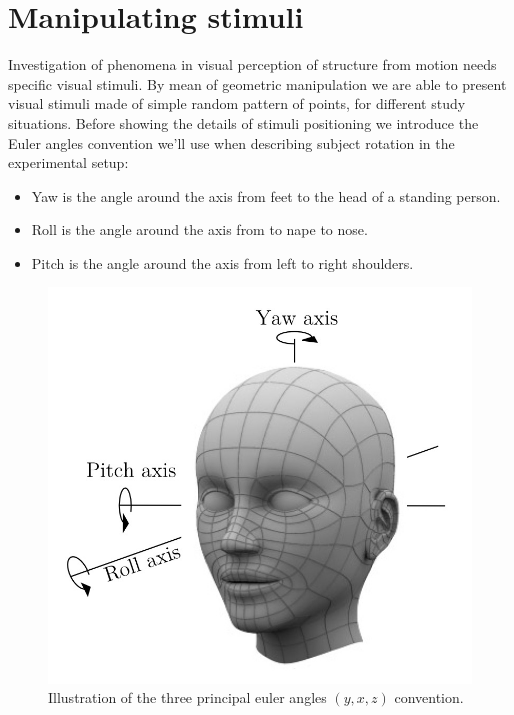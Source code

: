 \documentclass[acmtocl,acmnow]{acmtrans2m}
\begin{document}
\section{Manipulating stimuli}

Investigation of phenomena in visual perception of structure from motion needs specific visual stimuli. By mean of geometric manipulation we are able to present visual stimuli made of simple random 
pattern of points, for different study situations. Before showing the details of stimuli positioning we introduce the Euler angles convention we'll use when describing
subject rotation in the experimental setup:
\begin{itemize}
 \item Yaw is the angle around the axis from feet to the head of a standing person.
 \item Roll is the angle around the axis from to nape to nose.
 \item Pitch is the angle around the axis from left to right shoulders.
\end{itemize}


\begin{figure}[htb]
 \centering
\caption{Illustration of the three principal euler angles $(y,x,z)$ convention.}
 \includegraphics[bb=0 0 162 150]{images/head-yaw-roll-tilt.jpg}
\end{figure}
\end{document}
